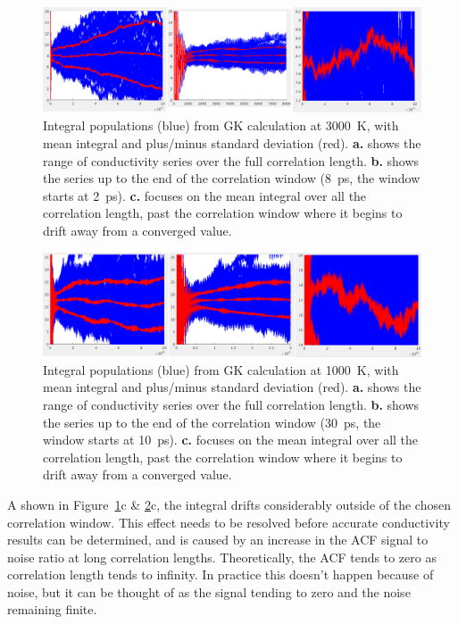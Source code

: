 \begin{figure}[h!]
\includegraphics[width=\linewidth]{Figures/gk_int_3000_000pc_trio.png}
\caption[gk int 3000 000pc trio]{Integral populations (blue) from GK calculation at 3000~K, with mean integral and plus/minus standard deviation (red). 
\textbf{a.} shows the range of conductivity series over the full correlation length.
\textbf{b.} shows the series up to the end of the correlation window (8~ps, the window starts at 2~ps).
\textbf{c.} focuses on the mean integral over all the correlation length, past the correlation window where it begins to drift away from a converged value.}
\label{fig:gk_int_3000_000pc_trio}
\end{figure}
%
\begin{figure}[h!]
\includegraphics[width=\linewidth]{Figures/gk_int_1000_000pc_trio.png}
\caption[gk int 1000 000pc trio]{Integral populations (blue) from GK calculation at 1000~K, with mean integral and plus/minus standard deviation (red). 
\textbf{a.} shows the range of conductivity series over the full correlation length.
\textbf{b.} shows the series up to the end of the correlation window (30~ps, the window starts at 10~ps).
\textbf{c.} focuses on the mean integral over all the correlation length, past the correlation window where it begins to drift away from a converged value.}
\label{fig:gk_int_1000_000pc_trio}
\end{figure}

A shown in Figure~\ref{fig:gk_int_3000_000pc_trio}c \& \ref{fig:gk_int_1000_000pc_trio}c, the integral drifts considerably outside of the chosen correlation window. This effect needs to be resolved before accurate conductivity results can be determined, and is caused by an increase in the ACF signal to noise ratio at long correlation lengths. Theoretically, the ACF tends to zero as correlation length tends to infinity. In practice this doesn't happen because of noise, but it can be thought of as the signal tending to zero and the noise remaining finite.

